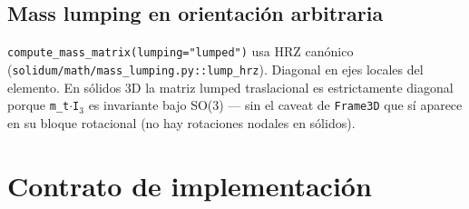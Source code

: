 \documentclass[11pt,letterpaper,oneside]{report}
\begin{document}
\subsection{Mass lumping en orientación arbitraria}

\texttt{compute\_mass\_matrix(lumping="lumped")} usa HRZ canónico (\texttt{solidum/math/mass\_lumping.py::lump\_hrz}). Diagonal en ejes locales del elemento. En sólidos 3D la matriz lumped traslacional es estrictamente diagonal porque \texttt{m\_t\ensuremath{\cdot}I\ensuremath{_{3}}} es invariante bajo SO(3) --- sin el caveat de \texttt{Frame3D} que sí aparece en su bloque rotacional (no hay rotaciones nodales en sólidos).


\section{Contrato de implementación}
\end{document}
